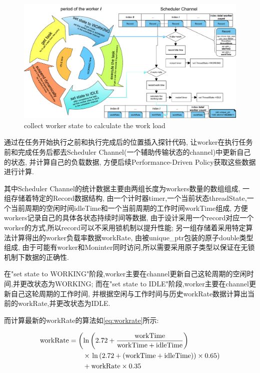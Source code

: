 \documentclass{mproj}
\begin{document}
\begin{figure}[h]
    \centering %
    \includegraphics[width=1.0\textwidth]{images/worker_collect_calculate.pdf} %
    \caption{collect worker state to calculate the work load} %
    \label{fig:worker_collect_calculate} %
\end{figure}
\FloatBarrier

通过在任务开始执行之前和执行完成后的位置插入探针代码,
让worker在执行任务前和完成任务后都去Scheduler Channel(一个辅助传输状态的channel)中更新自己的状态,
并计算自己的负载数据,
方便后续Performance-Driven Policy获取这些数据进行计算.

其中Scheduler Channel的统计数据主要由两组长度为workers数量的数组组成,
一组存储着特定的Record数据结构,
由一个计时器timer,一个当前状态threadState,一个当前周期的空闲时间idleTime和一个当前周期的工作时间workTime组成,
方便workers记录自己的具体各状态持续时间等数据,
由于设计采用一个record对应一个worker的方式,所以record可以不采用锁机制以提升性能;
另一组存储着采用特定算法计算得出的worker负载率数据workRate,
由被unique\_ptr包装的原子double类型组成,
由于可能有worker和Moninter同时访问,所以需要采用原子类型以保证在无锁机制下数据的正确性.

在"set state to WORKING"阶段,worker主要在channel更新自己这轮周期的空闲时间,并更改状态为WORKING;
而在"set state to IDLE"阶段,worker主要在channel更新自己这轮周期的工作时间,
并根据空闲与工作时间与历史workRate数据计算出当前的workRate,并更改状态为IDLE.

而计算最新的workRate的算法如\cref{eq:workrate}所示:

\begin{align}
    \text{workRate} & = \left( \ln\left( 2.72 + \frac{\text{workTime}}{\text{workTime} + \text{idleTime}} \right) \right. \notag   \\
                    & \qquad \times \left. \ln\left( 2.72 + (\text{workTime} + \text{idleTime}) \right) \times 0.65 \right) \notag \\
                    & \qquad + \text{workRate} \times 0.35 \label{eq:workrate}
\end{align}
\end{document}
